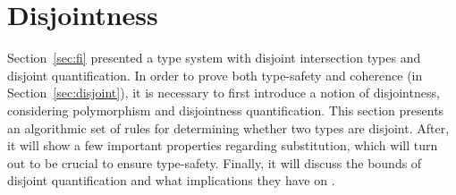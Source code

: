 \section{Disjointness} \label{sec:alg-dis}
Section~\ref{sec:fi} presented a type system with disjoint
intersection types and disjoint quantification. In order to prove 
both type-safety and coherence (in Section~\ref{sec:disjoint}), it is necessary to first introduce a
notion of disjointness, considering polymorphism and disjointness quantification.
This section presents an algorithmic set of rules for determining whether two types are disjoint. 
After, it will show a few important properties regarding substitution, which will turn out
to be crucial to ensure type-safety.
Finally, it will discuss the bounds of disjoint quantification and what implications
they have on \name. %

